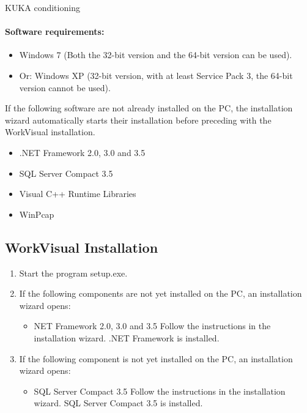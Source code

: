 \documentclass{book}
\begin{document}
\begin{chapter}{KUKA conditioning}
			\paragraph{Software requirements:}
				\begin{itemize}
					\item Windows 7 (Both the 32-bit version and the 64-bit version can be used).
					\item Or: Windows XP (32-bit version, with at least Service Pack 3, the 64-bit version cannot be used).
				\end{itemize}
			If the following software are not already installed on the PC, the installation wizard automatically starts their installation before preceding with the WorkVisual installation.
				\begin{itemize}
					\item .NET Framework 2.0, 3.0 and 3.5
					\item SQL Server Compact 3.5
					\item Visual C++ Runtime Libraries
					\item WinPcap
				\end{itemize}
			\subsection{WorkVisual Installation}
				\begin{enumerate}
					\item Start the program setup.exe.
					\item If the following components are not yet installed on the PC, an installation wizard opens:
						\begin{itemize}
							\item NET Framework 2.0, 3.0 and 3.5
							Follow the instructions in the installation wizard. .NET Framework is installed.
						\end{itemize}
					
					\item If the following component is not yet installed on the PC, an installation wizard opens:
						\begin{itemize}
						\item SQL Server Compact 3.5
						Follow the instructions in the installation wizard. SQL Server Compact 3.5 is installed.
						\end{itemize}
					

\end{enumerate}
\end{chapter}
\end{document}
